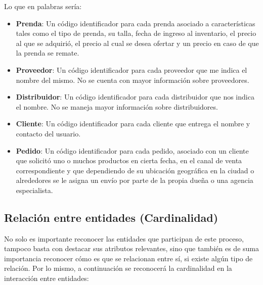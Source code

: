 \documentclass[11pt,letterpaper]{article}
\begin{document}
Lo que en palabras sería:

\begin{itemize}
    \item \textbf{Prenda}: Un código identificador para cada prenda asociado a características tales como el tipo de prenda, su talla, fecha de ingreso al inventario, el precio al que se adquirió, el precio al cual se desea ofertar y un precio en caso de que la prenda se remate.
    \item \textbf{Proveedor}: Un código identificador para cada proveedor que me indica el nombre del mismo. No se cuenta con mayor información sobre proveedores.
    \item \textbf{Distribuidor}: Un código identificador para cada distribuidor que nos indica el nombre. No se maneja mayor información sobre distribuidores.
    \item \textbf{Cliente}: Un código identificador para cada cliente que entrega el nombre y contacto del usuario.
    \item \textbf{Pedido}: Un código identificador para cada pedido, asociado con un cliente que solicitó uno o muchos productos en cierta fecha, en el canal de venta correspondiente y que dependiendo de su ubicación geográfica en la ciudad o alrededores se le asigna un envío por parte de la propia dueña o una agencia especialista.
\end{itemize}

\subsection*{Relación entre entidades (Cardinalidad)}

No solo es importante reconocer las entidades que participan de este proceso, tampoco basta con destacar sus atributos relevantes, sino que también es de suma importancia reconocer cómo es que se relacionan entre sí, si existe algún tipo de relación. Por lo mismo, a continuación se reconocerá la cardinalidad en la interacción entre entidades:
\end{document}
